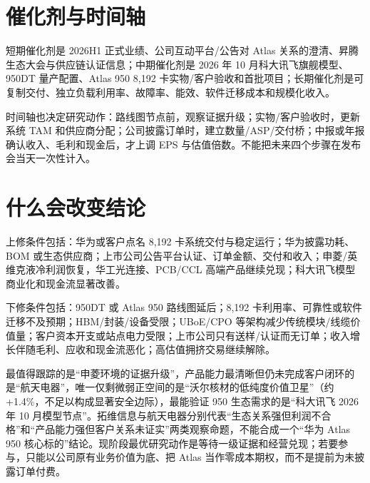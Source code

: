 \section{催化剂与时间轴}

短期催化剂是 2026H1 正式业绩、公司互动平台/公告对 Atlas 关系的澄清、昇腾生态大会与供应链认证信息；中期催化剂是 2026 年 10 月科大讯飞旗舰模型、950DT 量产配置、Atlas 950 8,192 卡实物/客户验收和首批项目；长期催化剂是可复制交付、独立负载利用率、故障率、能效、软件迁移成本和规模化收入。

时间轴也决定研究动作：路线图节点前，观察证据升级；实物/客户验收时，更新系统 TAM 和供应商分配；公司披露订单时，建立数量/ASP/交付桥；中报或年报确认收入、毛利和现金后，才上调 EPS 与估值倍数。不能把未来四个步骤在发布会当天一次性计入。

\section{什么会改变结论}

上修条件包括：华为或客户点名 8,192 卡系统交付与稳定运行；华为披露功耗、BOM 或生态供应商；上市公司公告平台认证、订单金额、交付和收入；申菱/英维克液冷利润恢复，华工光连接、PCB/CCL 高端产品继续兑现；科大讯飞模型商业化和现金流显著改善。

下修条件包括：950DT 或 Atlas 950 路线图延后；8,192 卡利用率、可靠性或软件迁移不及预期；HBM/封装/设备受限；UBoE/CPO 等架构减少传统模块/线缆价值量；客户资本开支或站点电力受限；上市公司只有送样/认证而无订单；收入增长伴随毛利、应收和现金流恶化；高估值拥挤交易继续解除。

\begin{houseviewbox}[最终结论]
最值得跟踪的是“申菱环境的证据升级”，产品能力最清晰但仍未完成客户闭环的是“航天电器”，唯一仅剩微弱正空间的是“沃尔核材的低纯度价值卫星”（约 +1.4\%，不足以构成显著安全边际），最能验证 950 生态需求的是“科大讯飞 2026 年 10 月模型节点”。拓维信息与航天电器分别代表“生态关系强但利润不合格”和“产品能力强但客户关系未证实”两类观察命题，不能合成一个“华为 Atlas 950 核心标的”结论。现阶段最优研究动作是等待一级证据和经营兑现；若要参与，只能以公司原有业务价值为底、把 Atlas 当作零成本期权，而不是提前为未披露订单付费。
\end{houseviewbox}
